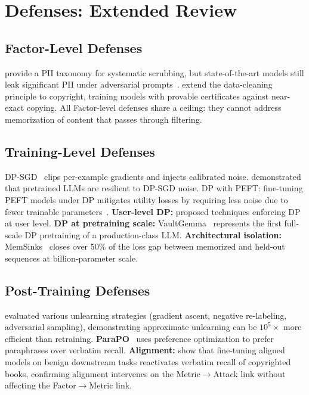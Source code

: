 \documentclass[11pt]{article}
\begin{document}
\section{Defenses: Extended Review}
\label{app:defenses}

\subsection{Factor-Level Defenses}

\citet{lukas2023analyzing} provide a PII taxonomy for systematic scrubbing,
but state-of-the-art models still leak significant PII under adversarial
prompts~\citep{li2024llmpbeassessingdataprivacy}.
\citet{vyas2023provable} extend the data-cleaning principle to copyright,
training models with provable certificates against near-exact copying.
All Factor-level defenses share a ceiling: they cannot address memorization
of content that passes through filtering.

\subsection{Training-Level Defenses}

DP-SGD~\citep{abadi2016deep} clips per-example gradients and injects
calibrated noise.
\citet{li2021large} demonstrated that pretrained LLMs are resilient to
DP-SGD noise.
DP with PEFT: fine-tuning PEFT models under DP mitigates utility losses by
requiring less noise due to fewer trainable
parameters~\citep{liu2024differentially,yu2022differentiallyprivatefinetuninglanguage,ma2024efficient}.
\textbf{User-level DP:} \citet{chua2024mind} proposed techniques enforcing DP
at user level.
\textbf{DP at pretraining scale:} VaultGemma~\citep{sinha2025vaultgemmadifferentiallyprivategemma}
represents the first full-scale DP pretraining of a production-class LLM.
\textbf{Architectural isolation:} MemSinks~\citep{ghosal2025memorization}
closes over 50\% of the loss gap between memorized and held-out sequences at
billion-parameter scale.

\subsection{Post-Training Defenses}

\citet{yao2024machine} evaluated various unlearning strategies (gradient
ascent, negative re-labeling, adversarial sampling), demonstrating approximate
unlearning can be $10^5\times$ more efficient than retraining.
\textbf{ParaPO}~\citep{chen2025parapoaligninglanguagemodels} uses preference
optimization to prefer paraphrases over verbatim recall.
\textbf{Alignment:} \citet{liu2026alignmentwhackamolefinetuning} show that
fine-tuning aligned models on benign downstream tasks reactivates verbatim
recall of copyrighted books, confirming alignment intervenes on the
Metric$\to$Attack link without affecting the Factor$\to$Metric link.
\end{document}
